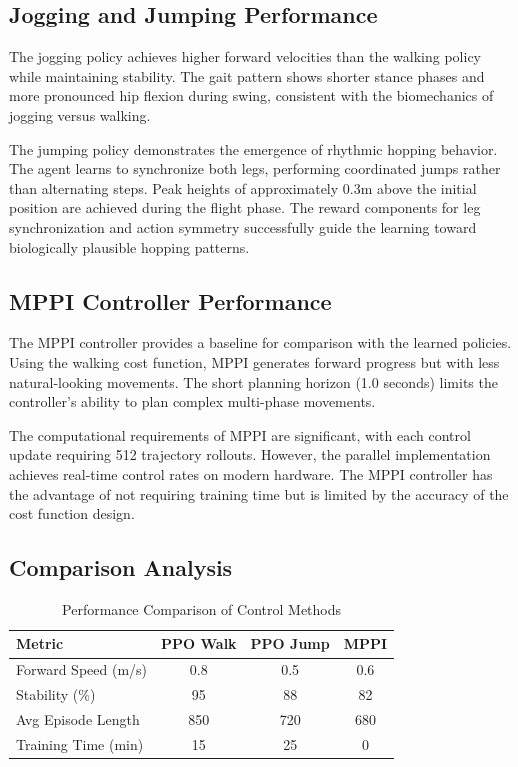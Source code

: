 \documentclass[conference]{IEEEtran}
\begin{document}
\subsection{Jogging and Jumping Performance}

The jogging policy achieves higher forward velocities than the walking policy while maintaining stability. The gait pattern shows shorter stance phases and more pronounced hip flexion during swing, consistent with the biomechanics of jogging versus walking.

The jumping policy demonstrates the emergence of rhythmic hopping behavior. The agent learns to synchronize both legs, performing coordinated jumps rather than alternating steps. Peak heights of approximately 0.3m above the initial position are achieved during the flight phase. The reward components for leg synchronization and action symmetry successfully guide the learning toward biologically plausible hopping patterns.

\subsection{MPPI Controller Performance}

The MPPI controller provides a baseline for comparison with the learned policies. Using the walking cost function, MPPI generates forward progress but with less natural-looking movements. The short planning horizon (1.0 seconds) limits the controller's ability to plan complex multi-phase movements.

The computational requirements of MPPI are significant, with each control update requiring 512 trajectory rollouts. However, the parallel implementation achieves real-time control rates on modern hardware. The MPPI controller has the advantage of not requiring training time but is limited by the accuracy of the cost function design.

\subsection{Comparison Analysis}

\begin{table}[t]
\centering
\caption{Performance Comparison of Control Methods}
\begin{tabular}{lccc}
\toprule
\textbf{Metric} & \textbf{PPO Walk} & \textbf{PPO Jump} & \textbf{MPPI}\\
\midrule
Forward Speed (m/s) & 0.8 & 0.5 & 0.6 \\
Stability (\%) & 95 & 88 & 82 \\
Avg Episode Length & 850 & 720 & 680 \\
Training Time (min) & 15 & 25 & 0 \\
\bottomrule
\end{tabular}
\label{tab:comparison}
\end{table}
\end{document}
